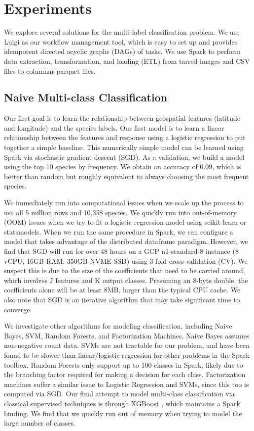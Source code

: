 \section{Experiments}

We explore several solutions for the multi-label classification problem. 
We use Luigi \cite{Rouhani2024spotify} as our workflow management tool, which is easy to set up and provides idempotent directed acyclic graphs (DAGs) of tasks. 
We use Spark \cite{armbrust2015spark} to perform data extraction, transformation, and loading (ETL) from tarred images and CSV files to columnar parquet files. 

\subsection{Naive Multi-class Classification}

Our first goal is to learn the relationship between geospatial features (latitude and longitude) and the species labels. 
Our first model is to learn a linear relationship between the features and response using a logistic regression to put together a simple baseline. 
This numerically simple model can be learned using Spark via stochastic gradient descent (SGD). 
As a validation, we build a model using the top 10 species by frequency. 
We obtain an accuracy of 0.09, which is better than random but roughly equivalent to always choosing the most frequent species.

We immediately run into computational issues when we scale up the process to use all 5 million rows and 10,358 species. 
We quickly run into out-of-memory (OOM) issues when we try to fit a logistic regression model using scikit-learn or statsmodels.
When we run the same procedure in Spark, we can configure a model that takes advantage of the distributed dataframe paradigm. 
However, we find that SGD will run for over 48 hours on a GCP n1-standard-8 instance (8 vCPU, 16GB RAM, 350GB NVME SSD) using 3-fold cross-validation (CV). 
We suspect this is due to the size of the coefficients that need to be carried around, which involves J features and K output classes. 
Presuming an 8-byte double, the coefficients alone will be at least 8MB, larger than the typical CPU cache. 
We also note that SGD is an iterative algorithm that may take significant time to converge.

We investigate other algorithms for modeling classification, including Naive Bayes, SVM, Random Forests, and Factorization Machines.
Naive Bayes assumes non-negative count data. 
SVMs are not tractable for our problem, and have been found to be slower than linear/logistic regression for other problems in the Spark toolbox. 
Random Forests only support up to 100 classes in Spark, likely due to the branching factor required for making a decision for each class. 
Factorization machines suffer a similar issue to Logistic Regression and SVMs, since this too is computed via SGD. 
Our final attempt to model multi-class classification via classical supervised techniques is through XGBoost \cite{chen2016xgboost}, which maintains a Spark binding. 
We find that we quickly run out of memory when trying to model the large number of classes. 

